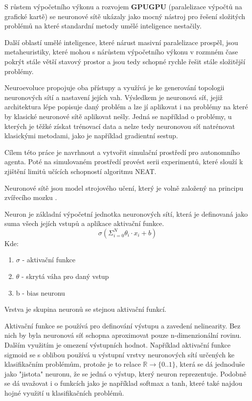 S růstem výpočetního výkonu a rozvojem \textbf{GPUGPU} (paralelizace výpočtů na grafické kartě) se neuronové sítě ukázaly jako mocný nástroj pro řešení složitých problémů na které standardní metody umělé inteligence nestačily.

Další oblastí umělé inteligence, které nárust masivní paralelizace prospěl, jsou metaheuristiky, které mohou  s nárůstem výpočetního výkonu v rozmném čase pokrýt stále větší stavový prostor a jsou tedy schopné rychle řešit stále složitější problémy.


Neuroevoluce propojuje oba přístupy a využívá je ke generování topologii neuronových sítí a nastavení jejích vah. Výsledkem je neuronová síť, jejiž architektura lépe popisuje daný problém a lze jí aplikovat i na problémy na které by klasické neuronové sítě aplikovat nešly. Jedná se například o problémy, u kterých je těžké získat trénovací data a nelze tedy neuronovou síť natrénovat klasickými metodami, jako je například gradientní sestup.

Cílem této práce je navrhnout a vytvořit simulační prostředí pro autonomního agenta. Poté na simulovaném prostředí provést serii experimentů, které slouží k zjištění limitů učících schopností algoritmu NEAT.


Neuronové sítě jsou model strojového učení, který je volně založený na principu zvířecího mozku \cite[s.~41]{fundementalsOfDeepLearning}.

Neuron je základní  výpočetní jednotka neuronových sítí, která je definovaná jako suma všech jejích vstupů a aplikace aktivační funkce.
	$$\sigma(\Sigma_{i=0}^{N} \theta_i \cdot x_{i} + b)$$
Kde:
\begin{enumerate}
	\item $\sigma$ - aktivační funkce
	\item $\theta$ - skrytá váha pro daný vstup
	\item b - bias neuronu
\end{enumerate}

Vrstva je skupina neuronů se stejnou aktivační funkcí. 

Aktivační funkce se používá pro definování výstupu a zavedení nelinearity. Bez nich by byla neuronová síť schopna aproximovat pouze n-dimenzionální rovinu. \cite[s.~65]{fundementalsOfDeepLearning} \\
Dalším využitím je omezení výstupních hodnot. Například aktivační funkce sigmoid se s oblibou používá u výstupní vrstvy neuronových sítí určených ke klasifikačním problémům, protože je to relace $\mathbb{R} \rightarrow \{0..1\}$, která se dá jednoduše jako "jistota" neuronu, že se jedná o výstup, který neuron reprezentuje. Podobně se dá uvažovat i o funkcích jako je například softmax a tanh, které také najdou hojné využití u klasifikačních problémů.

